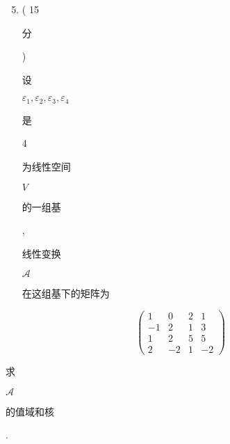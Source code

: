 \documentclass[10pt]{article}
\begin{document}
\begin{enumerate}
  \setcounter{enumi}{4}
  \item ( 15 \begin{CJK}{UTF8}{mj}分\end{CJK}) \begin{CJK}{UTF8}{mj}设\end{CJK} $\varepsilon_{1}, \varepsilon_{2}, \varepsilon_{3}, \varepsilon_{4}$ \begin{CJK}{UTF8}{mj}是\end{CJK} 4 \begin{CJK}{UTF8}{mj}为线性空间\end{CJK} $V$ \begin{CJK}{UTF8}{mj}的一组基\end{CJK}, \begin{CJK}{UTF8}{mj}线性变换\end{CJK} $\mathscr{A}$ \begin{CJK}{UTF8}{mj}在这组基下的矩阵为\end{CJK}
\end{enumerate}
$$
\left(\begin{array}{cccc}
1 & 0 & 2 & 1 \\
-1 & 2 & 1 & 3 \\
1 & 2 & 5 & 5 \\
2 & -2 & 1 & -2
\end{array}\right)
$$
\begin{CJK}{UTF8}{mj}求\end{CJK} $\mathscr{A}$ \begin{CJK}{UTF8}{mj}的值域和核\end{CJK}.
\end{document}

